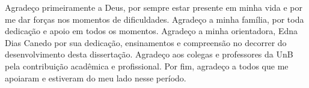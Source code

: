 Agradeço primeiramente a Deus, por sempre estar presente em minha vida e por me dar forças nos momentos de dificuldades. Agradeço a minha família, por toda dedicação e apoio em todos os momentos. Agradeço a minha orientadora, \prof \dr[a] Edna Dias Canedo por sua dedicação, ensinamentos e compreensão no decorrer do desenvolvimento desta dissertação. Agradeço aos colegas e professores da \acrlong{UnB} pela contribuição acadêmica e profissional. Por fim, agradeço a todos que me apoiaram e estiveram do meu lado nesse período.